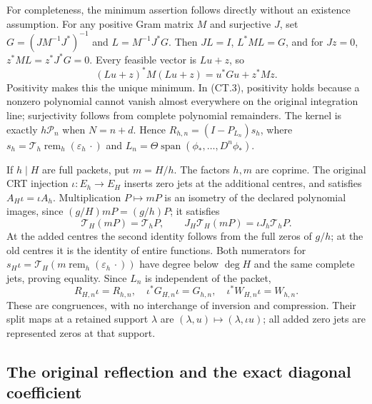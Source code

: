 For completeness, the minimum assertion follows directly without an
existence assumption.  For any positive Gram matrix \(M\) and
surjective \(J\), set
\(G=(JM^{-1}J^*)^{-1}\) and \(L=M^{-1}J^*G\).  Then
\(JL=I\), \(L^*ML=G\), and for \(Jz=0\),
\(z^*ML=z^*J^*G=0\).  Every feasible vector is \(Lu+z\), so
\[
 (Lu+z)^*M(Lu+z)=u^*Gu+z^*Mz.                            \tag{CT.5}
\]
Positivity makes this the unique minimum.  In (CT.3), positivity
holds because a nonzero polynomial cannot vanish almost everywhere
on the original integration line; surjectivity follows from complete
polynomial remainders.  The kernel is exactly
\(h\mathcal P_n\) when \(N=n+d\).  Hence
\(R_{h,n}=(I-P_{L_n})s_h\), where
\(s_h=\mathcal T_h\operatorname{rem}_h(\varepsilon_h\,\cdot)\)
and \(L_n=\Theta\operatorname{span}(\phi_*,\ldots,D^n\phi_*)\).

If \(h\mid H\) are full packets, put \(m=H/h\).  The factors
\(h,m\) are coprime.  The original CRT injection
\(\iota:E_h\to E_H\) inserts zero jets at the additional
centres, and satisfies \(A_H\iota=\iota A_h\).
Multiplication \(P\mapsto mP\) is an isometry of the declared
polynomial images, since \((g/H)mP=(g/h)P\); it satisfies
\[
 \mathcal T_H(mP)=\mathcal T_hP,\qquad
 J_H\mathcal T_H(mP)=\iota J_h\mathcal T_hP.              \tag{CT.6}
\]
At the added centres the second identity follows from the full zeros
of \(g/h\); at the old centres it is the identity of entire
functions.  Both numerators for
\(s_H\iota=\mathcal T_H(m\operatorname{rem}_h
(\varepsilon_h\,\cdot))\) have degree below \(\deg H\)
and the same complete jets, proving equality.  Since \(L_n\) is
independent of the packet,
\[
 R_{H,n}\iota=R_{h,n},\quad
 \iota^*G_{H,n}\iota=G_{h,n},\quad
 \iota^*W_{H,n}\iota=W_{h,n}.                            \tag{CT.7}
\]
These are congruences, with no interchange of inversion and
compression.  Their split maps at a retained support \(\lambda\)
are \((\lambda,u)\mapsto(\lambda,\iota u)\); all added zero
jets are represented zeros at that support.

\subsection{The original reflection and the exact diagonal coefficient}

